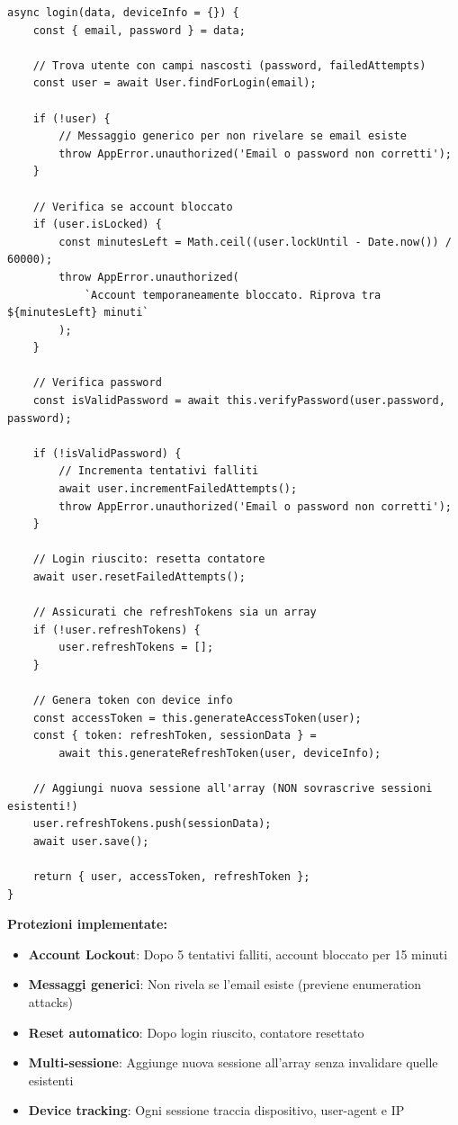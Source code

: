 \documentclass[11pt,a4paper]{article}
\begin{document}
\begin{lstlisting}[caption=Login con Account Lockout e Multi-Sessione]
async login(data, deviceInfo = {}) {
    const { email, password } = data;

    // Trova utente con campi nascosti (password, failedAttempts)
    const user = await User.findForLogin(email);

    if (!user) {
        // Messaggio generico per non rivelare se email esiste
        throw AppError.unauthorized('Email o password non corretti');
    }

    // Verifica se account bloccato
    if (user.isLocked) {
        const minutesLeft = Math.ceil((user.lockUntil - Date.now()) / 60000);
        throw AppError.unauthorized(
            `Account temporaneamente bloccato. Riprova tra ${minutesLeft} minuti`
        );
    }

    // Verifica password
    const isValidPassword = await this.verifyPassword(user.password, password);

    if (!isValidPassword) {
        // Incrementa tentativi falliti
        await user.incrementFailedAttempts();
        throw AppError.unauthorized('Email o password non corretti');
    }

    // Login riuscito: resetta contatore
    await user.resetFailedAttempts();

    // Assicurati che refreshTokens sia un array
    if (!user.refreshTokens) {
        user.refreshTokens = [];
    }

    // Genera token con device info
    const accessToken = this.generateAccessToken(user);
    const { token: refreshToken, sessionData } = 
        await this.generateRefreshToken(user, deviceInfo);

    // Aggiungi nuova sessione all'array (NON sovrascrive sessioni esistenti!)
    user.refreshTokens.push(sessionData);
    await user.save();

    return { user, accessToken, refreshToken };
}
\end{lstlisting}

\textbf{Protezioni implementate:}
\begin{itemize}
    \item \textbf{Account Lockout}: Dopo 5 tentativi falliti, account bloccato per 15 minuti
    \item \textbf{Messaggi generici}: Non rivela se l'email esiste (previene enumeration attacks)
    \item \textbf{Reset automatico}: Dopo login riuscito, contatore resettato
    \item \textbf{Multi-sessione}: Aggiunge nuova sessione all'array senza invalidare quelle esistenti
    \item \textbf{Device tracking}: Ogni sessione traccia dispositivo, user-agent e IP
\end{itemize}
\end{document}
